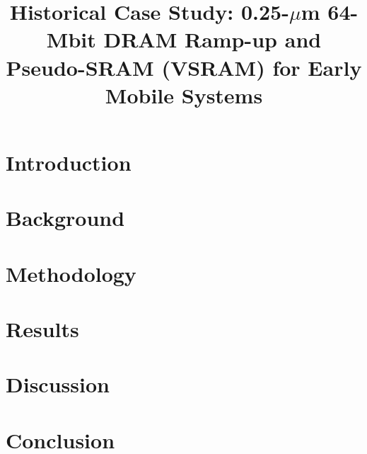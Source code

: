 \documentclass[conference]{IEEEtran}
\title{Historical Case Study: 0.25-\texorpdfstring{$\mu$}{µ}m 64-Mbit DRAM Ramp-up and Pseudo-SRAM (VSRAM) for Early Mobile Systems}
\author{
\IEEEauthorblockN{Shinichi Samizo}
\IEEEauthorblockA{Project Design Hub / Edusemi\\
}
}
\begin{document}
\maketitle



\section{Introduction}


\section{Background}


\section{Methodology}


\section{Results}


\section{Discussion}


\section{Conclusion}




\end{document}
